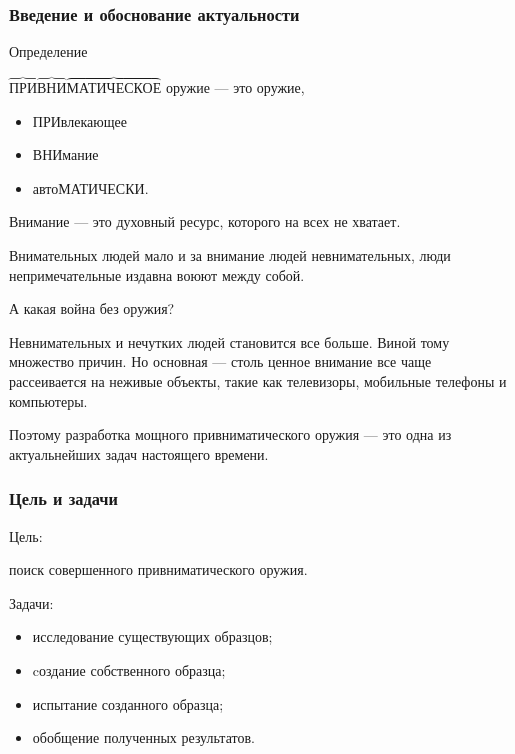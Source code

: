 \begin{frame}
    \frametitle{Введение и обоснование актуальности}
    
    \begin{block}{Определение}
        \par\bigskip
        \alert{$\overbrace{\text{ПРИ}}\overbrace{\text{ВНИ}}\overbrace{\text{МАТИЧЕСКОЕ}}$} оружие --- это оружие, 
        \begin{itemize}
            \item \alert{ПРИ}влекающее 
            \item \alert{ВНИ}мание 
            \item авто\alert{МАТИЧЕСКИ}.
        \end{itemize}
    \end{block}
    
    
    \alert{Внимание} --- это духовный ресурс, которого на всех не хватает. 

    \par\bigskip

    Внимательных людей мало и за внимание людей невнимательных, люди непримечательные издавна воюют между собой. 

    \par\bigskip

    А какая война без оружия?
\end{frame}
    
Невнимательных и нечутких людей становится все больше. Виной тому множество причин. Но основная --- столь ценное внимание все чаще рассеивается на неживые объекты, такие как телевизоры, мобильные телефоны и компьютеры.
    
Поэтому разработка мощного привниматического оружия --- это одна из актуальнейших задач настоящего времени.

\begin{frame}
    \frametitle{Цель и задачи}
    
    \begin{block}{Цель:}
        \begin{center}
            поиск \alert{совершенного} привниматического оружия.
        \end{center}
    \end{block}
    
    \par\bigskip
    
    \begin{block}{Задачи:}
        \begin{itemize}
            \item исследование существующих образцов; 
            \item cоздание собственного образца;
            \item испытание созданного образца;
            \item обобщение полученных результатов.
        \end{itemize}
    \end{block}
\end{frame}



